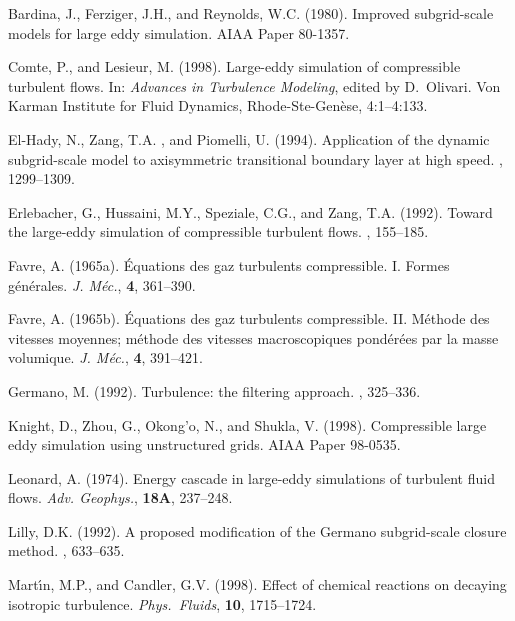 \documentclass[tcfd]{svjour}
\begin{document}
\begin{thebibliography}{}

 Bardina, J., Ferziger, J.H., and Reynolds, W.C. (1980). Improved subgrid-scale models
for large eddy simulation. AIAA Paper 80-1357.

 Comte, P., and Lesieur, M. (1998). Large-eddy simulation of compressible turbulent
f\/lows. In: {\it Advances in Turbulence Modeling}, edited by D.~Olivari. Von Karman Institute
for Fluid Dynamics, Rhode-Ste-Gen\`ese, 4:1--4:133.

 El-Hady, N., Zang, T.A. , and Piomelli, U. (1994). Application of the dynamic
subgrid-scale model to axisymmetric transitional boundary layer at high speed. ,
1299--1309.

 Erlebacher, G., Hussaini, M.Y., Speziale, C.G., and Zang, T.A. (1992). Toward the
large-eddy simulation of compressible turbulent f\/lows. , 155--185.

 Favre, A. (1965a). \'{E}quations des gaz turbulents compressible. I. Formes
g\'{e}n\'{e}rales. {\it J. M\'ec.}, {\bf 4}, 361--390.

 Favre, A. (1965b). \'{E}quations des gaz turbulents compressible. II. M\'{e}thode des
vitesses moyennes; m\'{e}thode des vitesses macroscopiques pond\'{e}r\'{e}es par la masse
volumique. {\it J. M\'ec.}, {\bf 4}, 391--421.

 Germano, M. (1992). Turbulence: the f\/iltering approach. , 325--336.

 Knight, D., Zhou, G., Okong'o, N., and Shukla, V. (1998). Compressible large eddy
simulation using unstructured grids. AIAA Paper 98-0535.

 Leonard, A. (1974). Energy cascade in large-eddy simulations of turbulent f\/luid f\/lows.
{\it Adv. Geophys.}, {\bf 18A}, 237--248.

 Lilly, D.K. (1992). A proposed modif\/ication of the Germano subgrid-scale closure
method. , 633--635.

 Mart\'{\i}n, M.P., and Candler, G.V. (1998). Effect of chemical reactions on decaying
isotropic turbulence. {\it Phys.\ Fluids}, {\bf 10}, 1715--1724.


\end{thebibliography}
\end{document}
